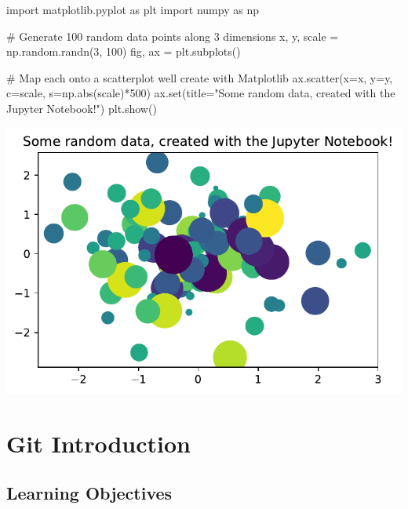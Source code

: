 \documentclass[
  letterpaper,
  DIV=11,
  numbers=noendperiod]{scrreprt}
\newenvironment{Shaded}{\begin{snugshade}}{\end{snugshade}}
\newcommand{\BuiltInTok}[1]{\textcolor[rgb]{0.00,0.23,0.31}{#1}}
\newcommand{\CommentTok}[1]{\textcolor[rgb]{0.37,0.37,0.37}{#1}}
\newcommand{\DecValTok}[1]{\textcolor[rgb]{0.68,0.00,0.00}{#1}}
\newcommand{\ImportTok}[1]{\textcolor[rgb]{0.00,0.46,0.62}{#1}}
\newcommand{\NormalTok}[1]{\textcolor[rgb]{0.00,0.23,0.31}{#1}}
\newcommand{\OperatorTok}[1]{\textcolor[rgb]{0.37,0.37,0.37}{#1}}
\newcommand{\StringTok}[1]{\textcolor[rgb]{0.13,0.47,0.30}{#1}}
\begin{document}
\begin{Shaded}
\begin{Highlighting}[]
\ImportTok{import}\NormalTok{ matplotlib.pyplot }\ImportTok{as}\NormalTok{ plt}
\ImportTok{import}\NormalTok{ numpy }\ImportTok{as}\NormalTok{ np}

\CommentTok{\# Generate 100 random data points along 3 dimensions}
\NormalTok{x, y, scale }\OperatorTok{=}\NormalTok{ np.random.randn(}\DecValTok{3}\NormalTok{, }\DecValTok{100}\NormalTok{)}
\NormalTok{fig, ax }\OperatorTok{=}\NormalTok{ plt.subplots()}

\CommentTok{\# Map each onto a scatterplot we\textquotesingle{}ll create with Matplotlib}
\NormalTok{ax.scatter(x}\OperatorTok{=}\NormalTok{x, y}\OperatorTok{=}\NormalTok{y, c}\OperatorTok{=}\NormalTok{scale, s}\OperatorTok{=}\NormalTok{np.}\BuiltInTok{abs}\NormalTok{(scale)}\OperatorTok{*}\DecValTok{500}\NormalTok{)}
\NormalTok{ax.}\BuiltInTok{set}\NormalTok{(title}\OperatorTok{=}\StringTok{"Some random data, created with the Jupyter Notebook!"}\NormalTok{)}
\NormalTok{plt.show()}
\end{Highlighting}
\end{Shaded}

\includegraphics{a_01_intro_to_notebooks_files/figure-pdf/cell-3-output-1.pdf}

\chapter{Git Introduction}\label{git-introduction}

\section{Learning Objectives}\label{learning-objectives}
\end{document}
